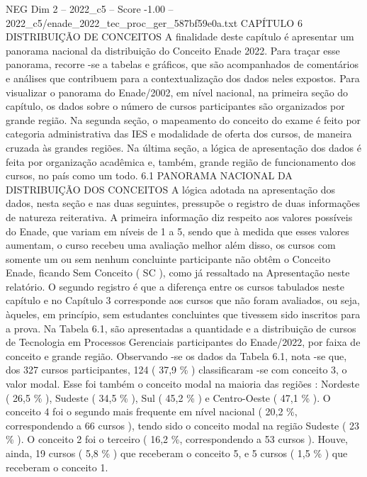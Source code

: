 \begin{textsample}{NEG Dim 2 – 2022\_c5 – Score -1.00 – 2022\_c5/enade\_2022\_tec\_proc\_ger\_587bf59e0a.txt}  \label{ex:f2_neg_216}
CAPÍTULO 6 DISTRIBUIÇÃO DE CONCEITOS A finalidade deste capítulo é apresentar um panorama nacional da distribuição do Conceito Enade 2022.
Para traçar esse panorama, recorre -se a tabelas e gráficos, que são acompanhados de comentários e análises que contribuem para a contextualização dos dados neles expostos.
Para visualizar o panorama do Enade/2002, em nível nacional, na primeira seção do capítulo, os dados sobre o número de cursos participantes são organizados por grande região.
Na segunda seção, o mapeamento do conceito do exame é feito por categoria administrativa das IES e modalidade de oferta dos cursos, de maneira cruzada às grandes regiões.
Na última seção, a lógica de apresentação dos dados é feita por organização acadêmica e, também, grande região de funcionamento dos cursos, no país como um todo. 6.1 PANORAMA NACIONAL DA DISTRIBUIÇÃO DOS CONCEITOS A lógica adotada na apresentação dos dados, nesta seção e nas duas seguintes, pressupõe o registro de duas informações de natureza reiterativa.
A primeira informação diz respeito aos valores possíveis do Enade, que variam em níveis de 1 a 5, sendo que à medida que esses valores aumentam, o curso recebeu uma avaliação melhor além disso, os cursos com somente um ou sem nenhum concluinte participante não obtêm o Conceito Enade, ficando Sem Conceito ( SC ), como já ressaltado na Apresentação neste relatório.
O segundo registro é que a diferença entre os cursos tabulados neste capítulo e no Capítulo 3 corresponde aos cursos que não foram avaliados, ou seja, àqueles, em princípio, sem estudantes concluintes que tivessem sido inscritos para a prova.
Na Tabela 6.1, são apresentadas a quantidade e a distribuição de cursos de Tecnologia em Processos Gerenciais participantes do Enade/2022, por faixa de conceito e grande região.
Observando -se os dados da Tabela 6.1, nota -se que, dos 327 cursos participantes, 124 ( 37,9 \% ) classificaram -se com conceito 3, o valor modal.
Esse foi também o conceito modal na maioria das regiões : Nordeste ( 26,5 \% ), Sudeste ( 34,5 \% ), Sul ( 45,2 \% ) e Centro-Oeste ( 47,1 \% ).
O conceito 4 foi o segundo mais frequente em nível nacional ( 20,2 \%, correspondendo a 66 cursos ), tendo sido o conceito modal na região Sudeste ( 23 \% ).
O conceito 2 foi o terceiro ( 16,2 \%, correspondendo a 53 cursos ).
Houve, ainda, 19 cursos ( 5,8 \% ) que receberam o conceito 5, e 5 cursos ( 1,5 \% ) que receberam o conceito 1.

\end{textsample}
